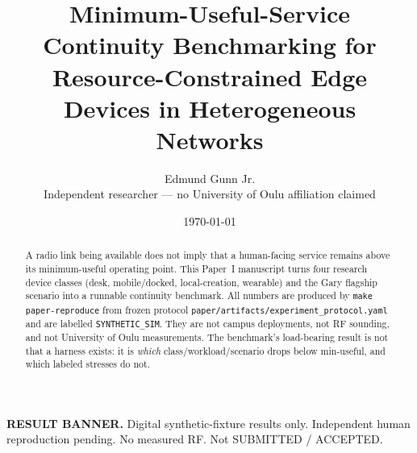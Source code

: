 \documentclass[11pt]{article}
\title{Minimum-Useful-Service Continuity Benchmarking for Resource-Constrained Edge Devices in Heterogeneous Networks}
\author{Edmund Gunn Jr.\\Independent researcher --- no University of Oulu affiliation claimed}
\date{\today}
\begin{document}
\maketitle
\begin{center}\textbf{RESULT BANNER.} Digital synthetic-fixture results only. Independent human reproduction pending. No measured RF. Not SUBMITTED / ACCEPTED.\end{center}
\begin{abstract}
A radio link being available does not imply that a human-facing service remains above its minimum-useful operating point.
This Paper~I manuscript turns four research device classes (desk, mobile/docked, local-creation, wearable) and the Gary flagship scenario into a runnable continuity benchmark.
All numbers are produced by \texttt{make paper-reproduce} from frozen protocol \texttt{paper/artifacts/experiment\_protocol.yaml} and are labelled \texttt{SYNTHETIC\_SIM}.
They are not campus deployments, not RF sounding, and not University of Oulu measurements.
The benchmark's load-bearing result is not that a harness exists: it is \emph{which} class/workload/scenario drops below min-useful, and which labeled stresses do not.
\end{abstract}






\end{document}

